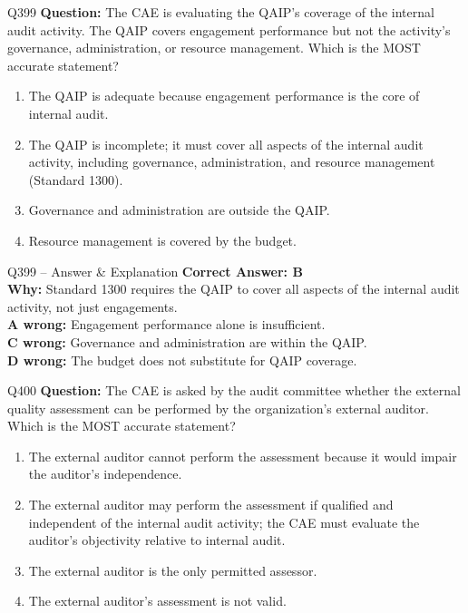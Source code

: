\documentclass[aspectratio=169,10pt]{beamer}
\begin{document}
	\begin{frame}[t]{Q399}
		\small
		\textbf{Question:} The CAE is evaluating the QAIP's coverage of the internal audit activity. The QAIP covers engagement performance but not the activity's governance, administration, or resource management. Which is the MOST accurate statement?
		\begin{enumerate}[label=\Alph*.,itemsep=1pt,topsep=2pt]
			\item The QAIP is adequate because engagement performance is the core of internal audit.
			\item The QAIP is incomplete; it must cover all aspects of the internal audit activity, including governance, administration, and resource management (Standard 1300).
			\item Governance and administration are outside the QAIP.
			\item Resource management is covered by the budget.
		\end{enumerate}
	\end{frame}
	
	\begin{frame}[t]{Q399 -- Answer \& Explanation}
		\small
		\textbf{Correct Answer: B} \\[4pt]
		\textbf{Why:} Standard 1300 requires the QAIP to cover all aspects of the internal audit activity, not just engagements. \\[4pt]
		\textbf{A wrong:} Engagement performance alone is insufficient. \\[2pt]
		\textbf{C wrong:} Governance and administration are within the QAIP. \\[2pt]
		\textbf{D wrong:} The budget does not substitute for QAIP coverage.
	\end{frame}
	
	\begin{frame}[t]{Q400}
		\small
		\textbf{Question:} The CAE is asked by the audit committee whether the external quality assessment can be performed by the organization's external auditor. Which is the MOST accurate statement?
		\begin{enumerate}[label=\Alph*.,itemsep=1pt,topsep=2pt]
			\item The external auditor cannot perform the assessment because it would impair the auditor's independence.
			\item The external auditor may perform the assessment if qualified and independent of the internal audit activity; the CAE must evaluate the auditor's objectivity relative to internal audit.
			\item The external auditor is the only permitted assessor.
			\item The external auditor's assessment is not valid.
		\end{enumerate}
	\end{frame}
	
\end{document}
